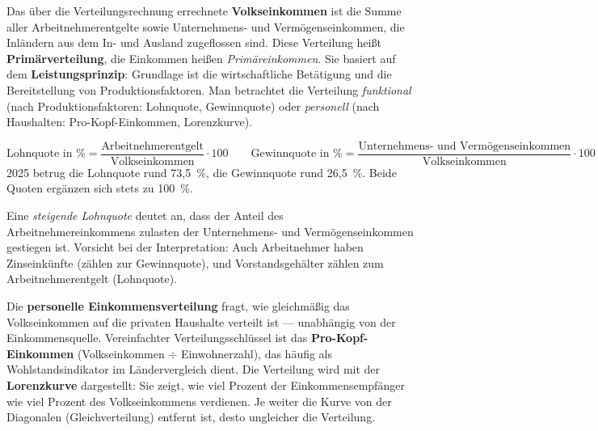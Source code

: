 \documentclass[11pt, a4paper]{article}
\begin{document}
Das über die Verteilungsrechnung errechnete \textbf{Volkseinkommen} ist die Summe aller
Arbeitnehmerentgelte sowie Unternehmens- und Vermögenseinkommen, die Inländern aus dem
In- und Ausland zugeflossen sind. Diese Verteilung heißt \textbf{Primärverteilung}, die
Einkommen heißen \emph{Primäreinkommen}. Sie basiert auf dem \textbf{Leistungsprinzip}:
Grundlage ist die wirtschaftliche Betätigung und die Bereitstellung von
Produktionsfaktoren. Man betrachtet die Verteilung \emph{funktional} (nach
Produktionsfaktoren: Lohnquote, Gewinnquote) oder \emph{personell} (nach Haushalten:
Pro-Kopf-Einkommen, Lorenzkurve).

\begin{merksatz}[title={\bfseries Formeln: Lohnquote und Gewinnquote}]
\[
\text{Lohnquote in \%} = \frac{\text{Arbeitnehmerentgelt}}{\text{Volkseinkommen}} \cdot 100
\qquad
\text{Gewinnquote in \%} = \frac{\text{Unternehmens- und Vermögenseinkommen}}{\text{Volkseinkommen}} \cdot 100
\]
2025 betrug die Lohnquote rund 73,5~\%, die Gewinnquote rund 26,5~\%. Beide Quoten ergänzen
sich stets zu 100~\%.
\end{merksatz}

Eine \emph{steigende Lohnquote} deutet an, dass der Anteil des Arbeitnehmereinkommens
zulasten der Unternehmens- und Vermögenseinkommen gestiegen ist. Vorsicht bei der
Interpretation: Auch Arbeitnehmer haben Zinseinkünfte (zählen zur Gewinnquote), und
Vorstandsgehälter zählen zum Arbeitnehmerentgelt (Lohnquote).

Die \textbf{personelle Einkommensverteilung} fragt, wie gleichmäßig das Volkseinkommen
auf die privaten Haushalte verteilt ist --- unabhängig von der Einkommensquelle.
Vereinfachter Verteilungsschlüssel ist das \textbf{Pro-Kopf-Einkommen} (Volkseinkommen
$\div$ Einwohnerzahl), das häufig als Wohlstandsindikator im Ländervergleich dient. Die
Verteilung wird mit der \textbf{Lorenzkurve} dargestellt: Sie zeigt, wie viel Prozent der
Einkommensempfänger wie viel Prozent des Volkseinkommens verdienen. Je weiter die Kurve
von der Diagonalen (Gleichverteilung) entfernt ist, desto ungleicher die Verteilung.
\end{document}
